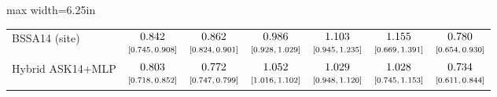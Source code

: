 \begin{table}[htbp]
\begin{adjustbox}{max width=6.25in}
\begin{tabular}{lcccccc}
BSSA14 (site) & $\begin{array}{@{}c@{}}0.842\\[-1pt] \scriptstyle[0.745,\,0.908]\end{array}$ & $\begin{array}{@{}c@{}}0.862\\[-1pt] \scriptstyle[0.824,\,0.901]\end{array}$ & $\begin{array}{@{}c@{}}0.986\\[-1pt] \scriptstyle[0.928,\,1.029]\end{array}$ & $\begin{array}{@{}c@{}}1.103\\[-1pt] \scriptstyle[0.945,\,1.235]\end{array}$ & $\begin{array}{@{}c@{}}1.155\\[-1pt] \scriptstyle[0.669,\,1.391]\end{array}$ & $\begin{array}{@{}c@{}}0.780\\[-1pt] \scriptstyle[0.654,\,0.930]\end{array}$ \\
Hybrid ASK14+MLP & $\begin{array}{@{}c@{}}0.803\\[-1pt] \scriptstyle[0.718,\,0.852]\end{array}$ & $\begin{array}{@{}c@{}}0.772\\[-1pt] \scriptstyle[0.747,\,0.799]\end{array}$ & $\begin{array}{@{}c@{}}1.052\\[-1pt] \scriptstyle[1.016,\,1.102]\end{array}$ & $\begin{array}{@{}c@{}}1.029\\[-1pt] \scriptstyle[0.948,\,1.120]\end{array}$ & $\begin{array}{@{}c@{}}1.028\\[-1pt] \scriptstyle[0.745,\,1.153]\end{array}$ & $\begin{array}{@{}c@{}}0.734\\[-1pt] \scriptstyle[0.611,\,0.844]\end{array}$ \\

\end{tabular}
\end{adjustbox}
\end{table}
